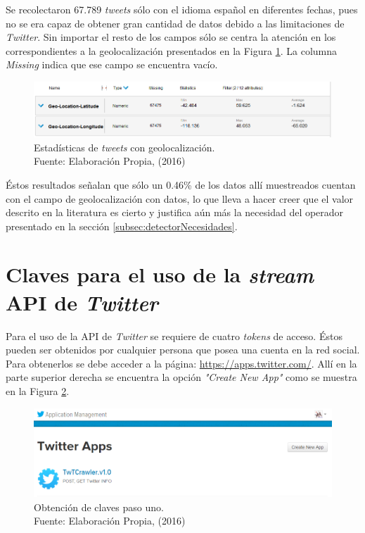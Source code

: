 Se recolectaron 67.789 \textit{tweets} sólo con el idioma español en diferentes fechas, pues no se era capaz de obtener gran cantidad de datos debido a las limitaciones de \textit{Twitter}. Sin importar el resto de los campos sólo se centra la atención en los correspondientes a la geolocalización presentados en la Figura \ref{fig:RMResult}. La columna \textit{Missing} indica que ese campo se encuentra vacío.

\begin{figure}[H]
        \centering
        \captionsetup{justification=centering}
        \includegraphics[scale=0.6]{images/ResultadoRapidMiner.png}
        \caption[Estadísticas de \textit{tweets} con geolocalización.]{Estadísticas de \textit{tweets} con geolocalización.\\Fuente: Elaboración Propia, (2016)}
        \label{fig:RMResult}
\end{figure}

Éstos resultados señalan que sólo un 0.46\% de los datos allí muestreados cuentan con el campo de geolocalización con datos, lo que lleva a hacer creer que el valor descrito en la literatura es cierto y justifica aún más la necesidad del operador presentado en la sección \ref{subsec:detectorNecesidades}.

\newpage
\section{Claves para el uso de la \textit{stream} API de \textit{Twitter}}
\label{apendice:clavesApi}

Para el uso de la API de \textit{Twitter} se requiere de cuatro \textit{tokens} de acceso. Éstos pueden ser obtenidos por cualquier persona que posea una cuenta en la red social. Para obtenerlos se debe acceder a la página: \url{https://apps.twitter.com/}. Allí en la parte superior derecha se encuentra la opción \textit{"Create New App"} como se muestra en la Figura \ref{fig:CreateNewApp}.

\begin{figure}[H]
        \centering
        \captionsetup{justification=centering}
        \includegraphics[scale=0.6]{images/CreateNewApp.png}
        \caption[Obtención de claves paso uno.]{Obtención de claves paso uno.\\Fuente: Elaboración Propia, (2016)}
        \label{fig:CreateNewApp}
\end{figure}

